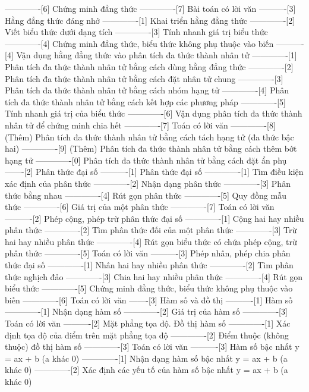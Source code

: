 -------------[6] Chứng minh đẳng thức
-------------[7] Bài toán có lời văn
----------[3] Hằng đẳng thức đáng nhớ
-------------[1] Khai triển hằng đẳng thức
-------------[2] Viết biểu thức dưới dạng tích
-------------[3] Tính nhanh giá trị biểu thức
-------------[4] Chứng minh đẳng thức, biểu thức không phụ thuộc vào biến
----------[4] Vận dụng hằng đẳng thức vào phân tích đa thức thành nhân tử
-------------[1] Phân tích đa thức thành nhân tử bằng cách dùng hằng đẳng thức
-------------[2] Phân tích đa thức thành nhân tử bằng cách đặt nhân tử chung
-------------[3] Phân tích đa thức thành nhân tử bằng cách nhóm hạng tử
-------------[4] Phân tích đa thức thành nhân tử bằng cách kết hợp các phương pháp
-------------[5] Tính nhanh giá trị của biểu thức
-------------[6] Vận dụng phân tích đa thức thành nhân tử để chứng minh chia hết
-------------[7] Toán có lời văn
-------------[8] (Thêm) Phân tích đa thức thành nhân tử bằng cách tách hạng tử (đa thức bậc hai)
-------------[9] (Thêm) Phân tích đa thức thành nhân tử bằng cách thêm bớt hạng tử
-------------[0] Phân tích đa thức thành nhân tử bằng cách đặt ẩn phụ
-------[2] Phân thức đại số
----------[1] Phân thức đại số
-------------[1] Tìm điều kiện xác định của phân thức
-------------[2] Nhận dạng phân thức
-------------[3] Phân thức bằng nhau
-------------[4] Rút gọn phân thức
-------------[5] Quy đồng mẫu thức
-------------[6] Giá trị của một phân thức
-------------[7] Toán có lời văn
----------[2] Phép cộng, phép trừ phân thức đại số
-------------[1] Cộng hai hay nhiều phân thức
-------------[2] Tìm phân thức đối của một phân thức
-------------[3] Trừ hai hay nhiều phân thức
-------------[4] Rút gọn biểu thức có chứa phép cộng, trừ phân thức
-------------[5] Toán có lời văn
----------[3] Phép nhân, phép chia phân thức đại số
-------------[1] Nhân hai hay nhiều phân thức
-------------[2] Tìm phân thức nghịch đảo
-------------[3] Chia hai hay nhiều phân thức
-------------[4] Rút gọn biểu thức
-------------[5] Chứng minh đẳng thức, biểu thức không phụ thuộc vào biến
-------------[6] Toán có lời văn
-------[3] Hàm số và đồ thị
----------[1] Hàm số
-------------[1] Nhận dạng hàm số
-------------[2] Giá trị của hàm số
-------------[3] Toán có lời văn
----------[2] Mặt phẳng tọa độ. Đồ thị hàm số
-------------[1] Xác định tọa độ của điểm trên mặt phẳng tọa độ
-------------[2] Điểm thuộc (không thuộc) đồ thị hàm số
-------------[3] Toán có lời văn
----------[3] Hàm số bậc nhất y = ax + b (a khác 0)
-------------[1] Nhận dạng hàm số bậc nhất y = ax + b (a khác 0)
-------------[2] Xác định các yếu tố của hàm số bậc nhất y = ax + b (a khác 0)
